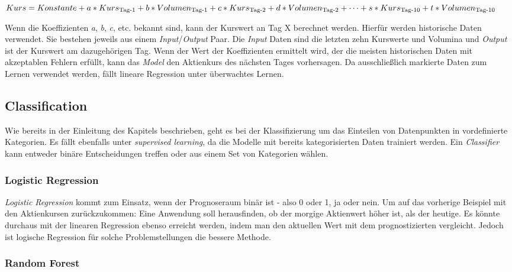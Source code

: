 \begin{math}
	\centering
	Kurs = Konstante + a * Kurs\textsubscript{Tag-1} + b * Volumen\textsubscript{Tag-1} + c * Kurs\textsubscript{Tag-2} + d * Volumen\textsubscript{Tag-2} + \dots + s * Kurs\textsubscript{Tag-10} + t * Volumen\textsubscript{Tag-10}
	\label{formular:stock1}
\end{math}

Wenn die Koeffizienten \textit{a}, \textit{b}, \textit{c}, etc. bekannt sind, kann der Kurswert an Tag X berechnet werden. Hierfür werden historische Daten verwendet. Sie bestehen jeweils aus einem \textit{Input}/\textit{Output} Paar. Die \textit{Input} Daten sind die letzten zehn Kurswerte und Volumina und \textit{Output} ist der Kurswert am dazugehörigen Tag. Wenn der Wert der Koeffizienten ermittelt wird, der die meisten historischen Daten mit akzeptablen Fehlern erfüllt, kann das \textit{Model} den Aktienkurs des nächsten Tages vorhersagen. Da ausschließlich markierte Daten zum Lernen verwendet werden, fällt lineare Regression unter überwachtes Lernen.

\subsection{Classification}
\label{sec:classification}

Wie bereits in der Einleitung des Kapitels beschrieben, geht es bei der Klassifizierung um das Einteilen von Datenpunkten in vordefinierte Kategorien. Es fällt ebenfalls unter \textit{supervised learning}, da die Modelle mit bereits kategorisierten Daten trainiert werden. Ein \textit{Classifier} kann entweder binäre Entscheidungen treffen oder aus einem Set von Kategorien wählen.

\subsubsection{Logistic Regression}
\label{sec:logistic_regression}

\textit{Logistic Regression} kommt zum Einsatz, wenn der Prognoseraum binär ist - also 0 oder 1, ja oder nein. Um auf das vorherige Beispiel mit den Aktienkursen zurückzukommen: Eine Anwendung soll herausfinden, ob der morgige Aktienwert höher ist, als der heutige. Es könnte durchaus mit der linearen Regression ebenso erreicht werden, indem man den aktuellen Wert mit dem prognostizierten vergleicht. Jedoch ist logische Regression für solche Problemstellungen die bessere Methode.

\subsubsection{Random Forest}
\label{sec:random_forest}


